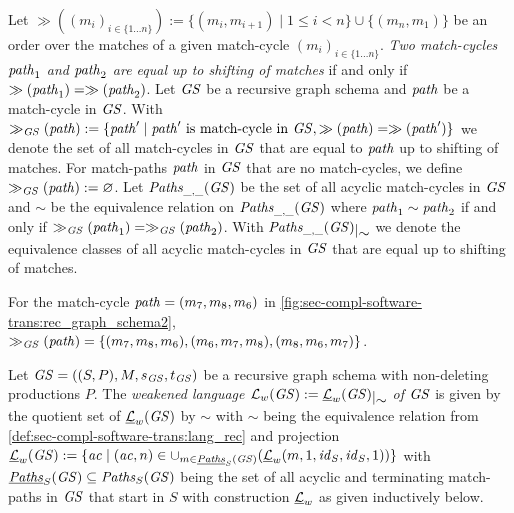 \begin{definition}
\label{def:sec-dc-general-rec:equ_match_cycles}
Let $\gg((m_i)_{i \in \{1\ldots n\}}):=\{(m_i,m_{i+1}) \mid 1 \leq i < n\} \cup \{(m_n,m_1)\}$ be an order over the matches of a given match-cycle $(m_i)_{i \in \{1\ldots n\}}$.
\emph{Two match-cycles $\mathit{path}_1$ and $\mathit{path}_2$ are equal up to shifting of matches} if and only if $\gg(\mathit{path}_1)=\gg(\mathit{path}_2)$.
Let $\mathit{GS}$ be a recursive graph schema and $\mathit{path}$ be a match-cycle in $\mathit{GS}$.
With $\gg_\mathit{GS}(\mathit{path}):=\{\mathit{path}' \mid \text{$\mathit{path}'$ is match-cycle in $\mathit{GS}$},\gg(\mathit{path})=\gg(\mathit{path}')\}$ we denote the set of all match-cycles in $\mathit{GS}$ that are equal to $\mathit{path}$ up to shifting of matches.
For match-paths $\mathit{path}$ in $\mathit{GS}$ that are no match-cycles, we define $\gg_\mathit{GS}(\mathit{path}):= \varnothing$.
Let $\mathit{Paths}_{\_,\_}(\mathit{GS})$ be the set of all acyclic match-cycles in $\mathit{GS}$ and $\sim$ be the equivalence relation on $\mathit{Paths}_{\_,\_}(\mathit{GS})$ where $\mathit{path}_1 \sim \mathit{path}_2$ if and only if $\gg_\mathit{GS}(\mathit{path}_1)=\gg_\mathit{GS}(\mathit{path}_2)$.
With $\quotient{\Paths_{\_,\_}(\GS)}{\sim}$ we denote the equivalence classes of all acyclic match-cycles in $\mathit{GS}$ that are equal up to shifting of matches.
\envEndMarker
\end{definition}

\begin{example}
For the match-cycle $\mathit{path}=(m_7,m_8,m_6)$ in \cref{fig:sec-compl-software-trans:rec_graph_schema2}, $\gg_\mathit{GS}(\mathit{path})=\{(m_7,m_8,m_6),(m_6,m_7,m_8),(m_8,m_6,m_7)\}$.
\envEndMarker
\end{example}

\begin{definition}
\label{def:sec-compl-software-trans:weakened_lang}
Let $\mathit{GS}=((S,P),M,s_\mathit{GS},t_\mathit{GS})$ be a recursive graph schema with non-deleting productions $P$.
The \emph{weakened language $\Lang_w(\GS):=\quotient{\underline{\Lang}_w(\GS)}{\sim}$ of $\mathit{GS}$} is given by the quotient set of $\underline{\mathcal{L}}_w(\mathit{GS})$ by $\sim$ with $\sim$ being the equivalence relation from \cref{def:sec-compl-software-trans:lang_rec} and projection $\underline{\mathcal{L}}_w(\mathit{GS}):=\{\mathit{ac} \mid (\mathit{ac},n) \in \cup_{m \in \underline{\mathit{Paths}}_S(\mathit{GS})}(\underline{\mathcal{L}}_w(m,1,\mathit{id}_S,\mathit{id}_S,1))\}$ with $\underline{\mathit{Paths}}_S(\mathit{GS}) \subseteq \mathit{Paths}_S(\mathit{GS})$ being the set of all acyclic and terminating match-paths in $\mathit{GS}$ that start in $S$ with construction $\underline{\mathcal{L}}_w$ as given inductively below.
\envEndMarker
\end{definition}


